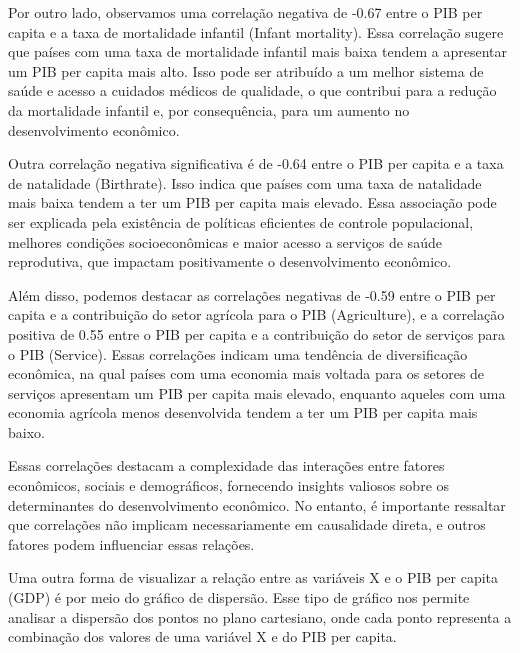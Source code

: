 \documentclass[conference]{IEEEtran}
\begin{document}
Por outro lado, observamos uma correlação negativa de -0.67 entre o PIB per capita e a taxa de mortalidade infantil (Infant mortality). Essa correlação sugere que países com uma taxa de mortalidade infantil mais baixa tendem a apresentar um PIB per capita mais alto. Isso pode ser atribuído a um melhor sistema de saúde e acesso a cuidados médicos de qualidade, o que contribui para a redução da mortalidade infantil e, por consequência, para um aumento no desenvolvimento econômico.

Outra correlação negativa significativa é de -0.64 entre o PIB per capita e a taxa de natalidade (Birthrate). Isso indica que países com uma taxa de natalidade mais baixa tendem a ter um PIB per capita mais elevado. Essa associação pode ser explicada pela existência de políticas eficientes de controle populacional, melhores condições socioeconômicas e maior acesso a serviços de saúde reprodutiva, que impactam positivamente o desenvolvimento econômico.

Além disso, podemos destacar as correlações negativas de -0.59 entre o PIB per capita e a contribuição do setor agrícola para o PIB (Agriculture), e a correlação positiva de 0.55 entre o PIB per capita e a contribuição do setor de serviços para o PIB (Service). Essas correlações indicam uma tendência de diversificação econômica, na qual países com uma economia mais voltada para os setores de serviços apresentam um PIB per capita mais elevado, enquanto aqueles com uma economia agrícola menos desenvolvida tendem a ter um PIB per capita mais baixo.

Essas correlações destacam a complexidade das interações entre fatores econômicos, sociais e demográficos, fornecendo insights valiosos sobre os determinantes do desenvolvimento econômico. No entanto, é importante ressaltar que correlações não implicam necessariamente em causalidade direta, e outros fatores podem influenciar essas relações. 

Uma outra forma de visualizar a relação entre as variáveis X e o PIB per capita (GDP) é por meio do gráfico de dispersão. Esse tipo de gráfico nos permite analisar a dispersão dos pontos no plano cartesiano, onde cada ponto representa a combinação dos valores de uma variável X e do PIB per capita.
\end{document}
